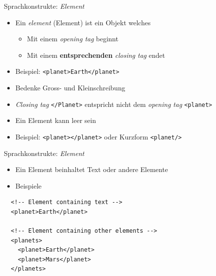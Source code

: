 \documentclass{beamer}
\begin{document}
\begin{frame}{Sprachkonstrukte: \emph{Element}}
	
	\begin{itemize}
		\item Ein \emph{element} (Element) ist ein Objekt welches 
		\begin{itemize}
			\item Mit einem \emph{opening tag} beginnt 
			\item Mit einem \textbf{entsprechenden} \emph{closing tag} endet
		\end{itemize}
		\item Beispiel: \texttt{<planet>Earth</planet>}
		\item Bedenke Gross- und Kleinschreibung
		\item \emph{Closing tag} \texttt{</Planet>} entspricht nicht dem \emph{opening tag} \texttt{<planet>}
		\item Ein Element kann leer sein
		\item Beispiel: \texttt{<planet></planet>} oder Kurzform \texttt{<planet/>}
	\end{itemize}
	
\end{frame}

\begin{frame}[fragile]{Sprachkonstrukte: \emph{Element}}
	
	\begin{itemize}
		\item Ein Element beinhaltet Text oder andere Elemente
		\item Beispiele
	\end{itemize}
	
	\begin{lstlisting}
  <!-- Element containing text -->
  <planet>Earth</planet>
	
  <!-- Element containing other elements -->
  <planets>
    <planet>Earth</planet>
    <planet>Mars</planet>
  </planets>
	\end{lstlisting}
	
\end{frame}
\end{document}
